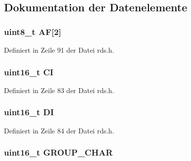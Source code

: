\subsection{Dokumentation der Datenelemente}
\hypertarget{structgroup__0b_ae5a8515ae995b21e542b2ad52b20c34e}{}
\subsubsection[{A\+F}]{\setlength{\rightskip}{0pt plus 5cm}uint8\+\_\+t A\+F\mbox{[}2\mbox{]}}\label{structgroup__0b_ae5a8515ae995b21e542b2ad52b20c34e}


Definiert in Zeile 91 der Datei rds.\+h.

\hypertarget{structgroup__0b_aa6fd8556e02ce89fed23057f1cb37e44}{}
\subsubsection[{C\+I}]{\setlength{\rightskip}{0pt plus 5cm}uint16\+\_\+t C\+I}\label{structgroup__0b_aa6fd8556e02ce89fed23057f1cb37e44}


Definiert in Zeile 83 der Datei rds.\+h.

\hypertarget{structgroup__0b_ad020d0abff338c9c34924a44478ac591}{}
\subsubsection[{D\+I}]{\setlength{\rightskip}{0pt plus 5cm}uint16\+\_\+t D\+I}\label{structgroup__0b_ad020d0abff338c9c34924a44478ac591}


Definiert in Zeile 84 der Datei rds.\+h.

\hypertarget{structgroup__0b_a66d4119990dc4c3e040a43885e9bb953}{}
\subsubsection[{G\+R\+O\+U\+P\+\_\+\+C\+H\+A\+R}]{\setlength{\rightskip}{0pt plus 5cm}uint16\+\_\+t G\+R\+O\+U\+P\+\_\+\+C\+H\+A\+R}\label{structgroup__0b_a66d4119990dc4c3e040a43885e9bb953}



